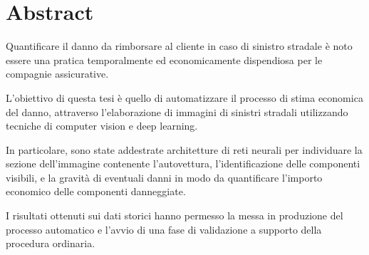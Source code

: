 


\chapter*{Abstract}
Quantificare il danno da rimborsare al cliente in caso di sinistro stradale è noto essere una pratica temporalmente ed economicamente dispendiosa per le compagnie assicurative.

L'obiettivo di questa tesi è quello di automatizzare il processo di stima economica del danno, attraverso l'elaborazione di immagini di sinistri stradali utilizzando tecniche di computer vision e deep learning. 

In particolare, sono state addestrate architetture di reti neurali per individuare la sezione dell'immagine contenente l'autovettura, l'identificazione delle componenti visibili, e la gravità di eventuali danni in modo da quantificare l'importo economico delle componenti danneggiate.

I risultati ottenuti sui dati storici hanno permesso la messa in produzione del processo automatico e l'avvio di una fase di validazione a supporto della procedura ordinaria.
